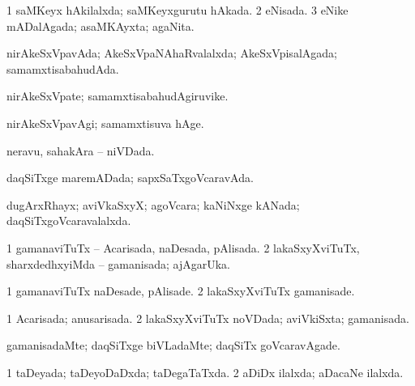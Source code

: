 \bentry
{} 
\gl{\gu}
\expl{}
\bmng
\bnum
\num{1} saMKeyx hAkilalxda; saMKeyxgurutu hAkada. 
\num{2} eNisada. 
\num{3} eNike mADalAgada; asaMKAyxta; agaNita. 
\enum
\emng
\eentry

\bentry
{} 
\gl{\saMkiSx}
\expl{}
\bmng
{} 
\emng
\eentry

\bentry
{} 
\gl{\gu}
\expl{}
\bmng
nirAkeSxVpavAda; AkeSxVpaNAhaRvalalxda; AkeSxVpisalAgada; samamxtisabahudAda. 
\emng
\eentry

\bentry
{} 
\gl{\nA}
\expl{}
\bmng
nirAkeSxVpate; samamxtisabahudAgiruvike. 
\emng
\eentry

\bentry
{} 
\gl{\kirxvi}
\expl{}
\bmng
nirAkeSxVpavAgi; samamxtisuva hAge. 
\emng
\eentry

\bentry
{} 
\gl{\gu}
\expl{}
\bmng
neravu, sahakAra -- niVDada. 
\emng
\eentry

\bentry
{} 
\gl{\gu}
\expl{}
\bmng
daqSiTxge maremADada; sapxSaTxgoVcaravAda. 
\emng
\eentry

\bentry
{} 
\gl{\gu}
\expl{}
\bmng
dugArxRhayx; aviVkaSxyX; agoVcara; kaNiNxge kANada; daqSiTxgoVcaravalalxda. 
\emng
\eentry

\bentry
{} 
\gl{\gu}
\expl{}
\bmng
\bnum
\num{1} gamanaviTuTx -- Acarisada, naDesada, pAlisada. 
\num{2} lakaSxyXviTuTx, sharxdedhxyiMda -- gamanisada; ajAgarUka. 
\enum
\emng
\eentry

\bentry
{} 
\gl{\kirxvi}
\expl{}
\bmng
\bnum
\num{1} gamanaviTuTx naDesade, pAlisade. 
\num{2} lakaSxyXviTuTx gamanisade. 
\enum
\emng
\eentry

\bentry
{} 
\gl{\gu}
\expl{}
\bmng
\bnum
\num{1} Acarisada; anusarisada. 
\num{2} lakaSxyXviTuTx noVDada; aviVkiSxta; gamanisada. 
\enum
\emng
\eentry

\bentry
{} 
\gl{\kirxvi}
\expl{}
\bmng
gamanisadaMte; daqSiTxge biVLadaMte; daqSiTx goVcaravAgade. 
\emng
\eentry

\bentry
{} 
\gl{\gu}
\expl{}
\bmng
\bnum
\num{1} taDeyada; taDeyoDaDxda; taDegaTaTxda. 
\num{2} aDiDx ilalxda; aDacaNe ilalxda. 
\enum
\emng
\eentry

